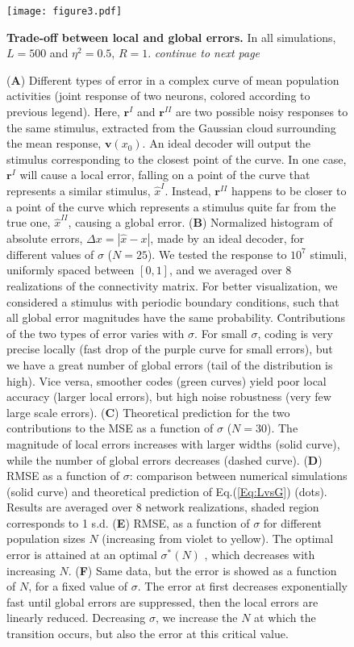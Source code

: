 \documentclass[a4paper]{article}%
\begin{document}
\begin{figure}[ptb]
\centering
\texttt{[image: figure3.pdf]}
\caption{\textbf{Trade-off
between local and global errors.} In all simulations, $L=500$ and $\eta^{2} =
0.5$, $R=1$. 
\emph{continue to next page}}
\end{figure}
\begin{figure}[t]
\captionsetup{labelformat=adja-page} \ContinuedFloat
\caption[Figure]{  (\textbf{A}) Different types of error in a complex curve of mean population activities
(joint response of two neurons, colored according to
previous legend). Here, $\mathbf{r}^{I}$ and $\mathbf{r}^{II}$ are two possible
noisy responses to the same stimulus, extracted from the Gaussian cloud
surrounding the mean response, $\mathbf{v}(x_{0})$. An ideal decoder will
output the stimulus corresponding to the closest point of the curve.
In one case, $\mathbf{r}^{I}$ will cause a local error, falling on a point of the curve
that represents a similar stimulus, $\hat{x}^{I}$. Instead, $\mathbf{r}^{II}$ 
 happens to be closer to a point of the curve which represents a
stimulus quite far from the true one, $\hat{x}^{II}$, causing a global
error. (\textbf{B}) Normalized histogram of absolute errors, $\Delta x =
|\hat{x}-x|$, made by an ideal decoder, for different values of $\sigma$
($N=25$). We tested the response to $10^{7}$ stimuli, uniformly spaced between
$[0,1]$, and we averaged over 8 realizations of the connectivity matrix. For better visualization, we considered a stimulus
with periodic boundary conditions, such that all global error magnitudes have
the same probability. Contributions of the two types of error varies with
$\sigma$. For small $\sigma$, coding is very precise locally (fast drop of the
purple curve for small errors), but we have a great number of global errors
(tail of the distribution is high). Vice versa, smoother codes (green
curves) yield poor local accuracy (larger local errors), but high noise
robustness (very few large scale errors). (\textbf{C}) Theoretical prediction
for the two contributions to the MSE as a function of $\sigma$
($N=30$). The magnitude of local errors increases with larger widths (solid
curve), while the number of global errors decreases (dashed curve).
(\textbf{D}) RMSE  as a function of $\sigma$: comparison between
numerical simulations (solid curve) and theoretical prediction of
Eq.(\ref{Eq:LvsG}) (dots). Results are averaged over 8
network realizations, shaded region corresponds to 1 s.d.
 (\textbf{E}) RMSE,
as a function of $\sigma$ for different population sizes $N$
(increasing from violet to yellow). The optimal error is attained at an
optimal $\sigma^{*}(N)$ , which decreases with increasing $N$.  (\textbf{F}) Same
data, but the error is showed as a function of $N$, for a fixed value of
$\sigma$. The error at first decreases exponentially fast until global errors
are suppressed, then the local errors are linearly reduced. Decreasing
$\sigma$, we increase the $N$ at which the transition occurs, but also the
error at this critical value. }
\label{Fig:3}
\end{figure}\clearpage
\end{document}
